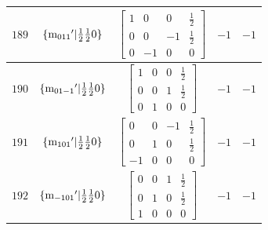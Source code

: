 \documentclass[fleqn,8pt]{jsarticle}
\begin{document}
\begin{longtable}{ccccc}
$ 189 $ & $ \{{\rm m}_{011}{}'|\frac{1}{2} \frac{1}{2} 0\} $ & $ \begin{bmatrix} 1 & 0 & 0 & \frac{1}{2} \\ 0 & 0 & -1 & \frac{1}{2} \\ 0 & -1 & 0 & 0 \end{bmatrix} $ & $ -1 $ & $ -1 $ \\ \hline
$ 190 $ & $ \{{\rm m}_{01-1}{}'|\frac{1}{2} \frac{1}{2} 0\} $ & $ \begin{bmatrix} 1 & 0 & 0 & \frac{1}{2} \\ 0 & 0 & 1 & \frac{1}{2} \\ 0 & 1 & 0 & 0 \end{bmatrix} $ & $ -1 $ & $ -1 $ \\ \hline
$ 191 $ & $ \{{\rm m}_{101}{}'|\frac{1}{2} \frac{1}{2} 0\} $ & $ \begin{bmatrix} 0 & 0 & -1 & \frac{1}{2} \\ 0 & 1 & 0 & \frac{1}{2} \\ -1 & 0 & 0 & 0 \end{bmatrix} $ & $ -1 $ & $ -1 $ \\ \hline
$ 192 $ & $ \{{\rm m}_{-101}{}'|\frac{1}{2} \frac{1}{2} 0\} $ & $ \begin{bmatrix} 0 & 0 & 1 & \frac{1}{2} \\ 0 & 1 & 0 & \frac{1}{2} \\ 1 & 0 & 0 & 0 \end{bmatrix} $ & $ -1 $ & $ -1 $ \\
\end{longtable}
\end{document}
